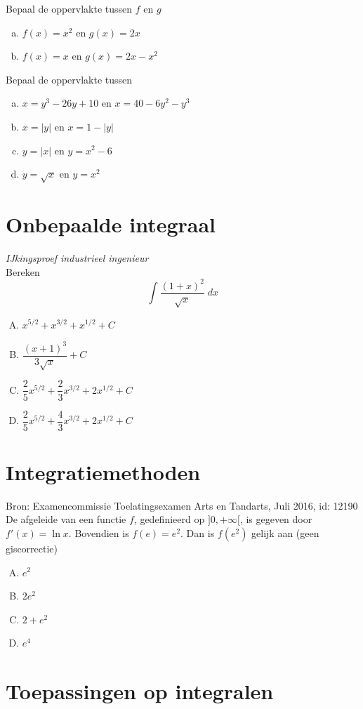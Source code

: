 \documentclass[a4paper,12pt]{article}
\begin{document}
\begin{oefening}
Bepaal de oppervlakte tussen $f$ en $g$
\begin{enumerate}[(a)]
\itemsep1em
  \item $f(x)=x^2$ en $g(x)=2x$
  \item $f(x)=x$ en $g(x)=2x-x^2$
\end{enumerate}
\end{oefening}

\begin{oefening}
Bepaal de oppervlakte tussen
\begin{enumerate}[(a)]
\itemsep1em
  \item $x=y^3-26y+10$ en $x=40-6y^2-y^3$
  \item $x=|y|$ en $x=1-|y|$
  \item $y=|x|$ en $y=x^2-6$
  \item $y=\sqrt{x}$ en $y=x^2$
\end{enumerate}
\end{oefening}

\pagebreak
\section{Onbepaalde integraal}

\begin{oefening} {\scriptsize \em IJkingsproef industrieel ingenieur}\\
Bereken
$$\int \dfrac{(1+x)^2}{\sqrt{x}}\;dx$$
\begin{enumerate}[(A)]
\itemsep.5em
  \item $x^{5/2}+x^{3/2}+x^{1/2} + C$
  \item $\dfrac{(x+1)^3}{3\sqrt{x}} + C$
  \item $\dfrac{2}{5}x^{5/2}+\dfrac{2}{3}x^{3/2}+2x^{1/2} + C$
  \item $\dfrac{2}{5}x^{5/2}+\dfrac{4}{3}x^{3/2}+2x^{1/2} + C$
\end{enumerate}
\end{oefening}

\pagebreak
\section{Integratiemethoden}


\begin{oefening}{\scriptsize Bron: Examencommissie Toelatingsexamen Arts en Tandarts, Juli 2016, id: 12190}\\
De afgeleide van een functie $f$, gedefinieerd op $]0,+\infty[$, is gegeven door $f'(x)=\ln x$. Bovendien is $f(e)=e^2$. Dan is $f(e^2)$ gelijk aan \hfill(geen giscorrectie)
\begin{enumerate}[(A)]
  \itemsep.5em
  \item $e^2$
  \item $2e^2$
  \item $2+e^2$
  \item $e^4$
\end{enumerate}
\end{oefening}

\pagebreak
\section{Toepassingen op integralen}


\end{document}
